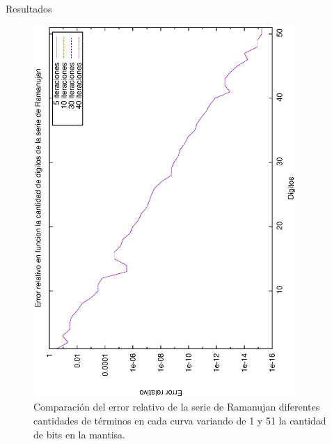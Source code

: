 \begin{section}{Resultados}
	\begin{figure}[H]
	  \centering
		\includegraphics[width=10cm,angle=-90]{graficos/ramanujan_1a51p.eps}
	  \caption{Comparación del error relativo de la serie de Ramanujan diferentes cantidades de términos en cada curva variando de 1 y 51 la cantidad de bits en la mantisa.}
	  \label{fig:ramanujan_51p}
	\end{figure}
	
	\VSP


\end{section}
